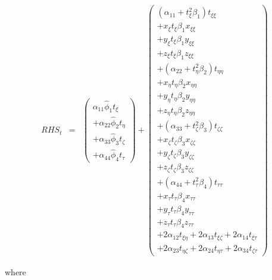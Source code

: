 \begin{eqnarray}
RHS_t
&=&
\left(
\begin{array}{r}
\alpha_{11} \widehat{\phi}_1 t_{\xi} 
\\
+
\alpha_{22} \widehat{\phi}_2 t_{\eta} 
\\
+
\alpha_{33} \widehat{\phi}_3 t_{\zeta} 
\\
+
\alpha_{44} \widehat{\phi}_4 t_{\tau} 
\end{array}
\right)
+
\left(
\begin{array}{r}
\left(\alpha_{11} + t_{\xi}^2 \beta_1 \right) t_{\xi \xi}
\\
+ x_{\xi} t_{\xi} \beta_1 x_{\xi \xi} 
\\
+ y_{\xi} t_{\xi} \beta_1 y_{\xi \xi} 
\\
+ z_{\xi} t_{\xi} \beta_1 z_{\xi \xi} 
\\
+
\left(\alpha_{22} + t_{\eta}^2 \beta_2 \right) t_{\eta \eta}
\\
+ x_{\eta} t_{\eta} \beta_2 x_{\eta \eta} 
\\
+ y_{\eta} t_{\eta} \beta_2 y_{\eta \eta} 
\\
+ z_{\eta} t_{\eta} \beta_2 z_{\eta \eta} 
\\
+
\left(\alpha_{33} + t_{\zeta}^2 \beta_3 \right) t_{\zeta \zeta}
\\
+ x_{\zeta} t_{\zeta} \beta_3 x_{\zeta \zeta} 
\\
+ y_{\zeta} t_{\zeta} \beta_3 y_{\zeta \zeta} 
\\
+ z_{\zeta} t_{\zeta} \beta_3 z_{\zeta \zeta} 
\\
+
\left(\alpha_{44} + t_{\tau}^2 \beta_4 \right) t_{\tau \tau}
\\
+ x_{\tau} t_{\tau} \beta_4 x_{\tau \tau} 
\\
+ y_{\tau} t_{\tau} \beta_4 y_{\tau \tau} 
\\
+ z_{\tau} t_{\tau} \beta_4 z_{\tau \tau} 
\\
+ 2 \alpha_{12} t_{\xi \eta}
+ 2 \alpha_{13} t_{\xi \zeta}
+ 2 \alpha_{14} t_{\xi \tau}
\\
+ 2 \alpha_{23} t_{\eta \zeta}
+ 2 \alpha_{24} t_{\eta \tau}
+ 2 \alpha_{34} t_{\zeta \tau}
\end{array}
\right)
\nonumber
\end{eqnarray}

where

